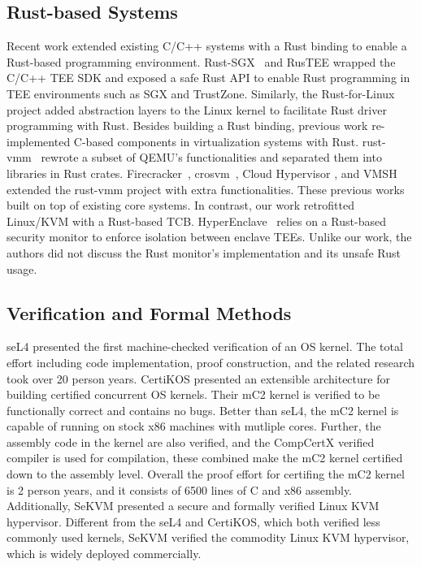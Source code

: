 \subsection{Rust-based Systems}
Recent work extended existing C/C++ systems with a Rust binding to enable
a Rust-based programming environment. Rust-SGX~\cite{rustsgx} and RusTEE
\cite{rustee} wrapped the C/C++ TEE SDK and exposed a safe Rust API
to enable Rust programming in TEE environments such as SGX and TrustZone.
Similarly, the Rust-for-Linux~\cite{Rust-for-Linux} project added
abstraction layers to the Linux kernel to facilitate Rust driver
programming with Rust.
Besides building a Rust binding, previous work re-implemented C-based
components in virtualization systems with Rust.
rust-vmm~\cite{rust-vmm} rewrote a subset of QEMU's functionalities
and separated them into libraries in Rust crates.
Firecracker~\cite{Firecracker}, crosvm~\cite{crosvm}, Cloud Hypervisor
\cite{CloudHypervisor}, and VMSH~\cite{VMSH} extended the
rust-vmm project with extra functionalities. These previous works
built on top of existing core systems. In contrast, our work
retrofitted Linux/KVM with a Rust-based TCB.
HyperEnclave~\cite{hyperenclave} relies on a Rust-based security
monitor to enforce isolation between enclave TEEs. Unlike
our work, the authors did not discuss the Rust monitor's implementation
and its unsafe Rust usage.

\subsection{Verification and Formal Methods}

seL4 \cite{sel4} presented the first machine-checked verification of an OS
kernel. The total effort including code implementation, proof construction,
and the related research took over 20 person years.
CertiKOS \cite{certikos} presented an extensible architecture for building
certified concurrent OS kernels. Their mC2 kernel is verified to be
functionally correct and contains no bugs. Better than seL4, the mC2 kernel
is capable of running on stock x86 machines with mutliple cores. Further,
the assembly code in the kernel are also verified, and the CompCertX verified
compiler is used for compilation, these combined make the mC2 kernel certified
down to the assembly level. Overall the proof effort for certifing the mC2
kernel is 2 person years, and it consists of 6500 lines of C and x86 assembly.
Additionally, SeKVM \cite{sekvm} presented a secure and formally verified Linux
KVM hypervisor. Different from the seL4 and CertiKOS, which both verified
less commonly used kernels, SeKVM verified the commodity Linux KVM hypervisor,
which is widely deployed commercially.


